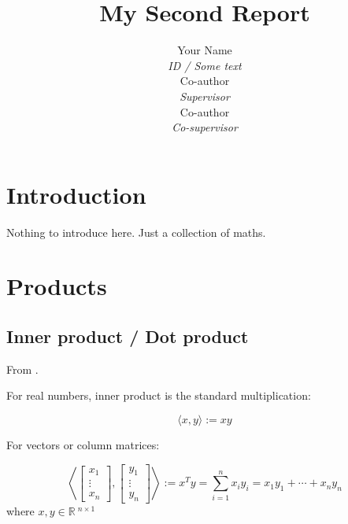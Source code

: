 \documentclass{article}
\title{My Second Report}
\author{Your Name \\ \textit{ID / Some text} \\ \AND
        Co-author \\ \textit{Supervisor} \\ \AND
        Co-author \\ \textit{Co-supervisor}}
\begin{document}
\maketitle




\section{Introduction}
\label{sec: Introduction}

Nothing to introduce here. Just a collection of maths.





\section{Products}
\label{sec: Products}

\subsection{Inner product / Dot product}
\label{subsec: Inner product}

From \cite{wiki2019innerProd,wiki2019dotProd,wiki2019cosineSim}.

For real numbers, inner product is the standard multiplication:

\begin{equation}
    \langle x, y\rangle := x y
\end{equation}

For vectors or column matrices:

\begin{equation}
    \left\langle\left[ \begin{array}{c}{ x_{1}} \\ {\vdots} \\ {x_{n}}\end{array}\right], \left[ \begin{array}{c}{y_{1}} \\ {\vdots} \\ {y_{n}}\end{array}\right]\right\rangle := x^{T} y=\sum_{i=1}^{n} x_{i} y_{i}=x_{1} y_{1}+\cdots+x_{n} y_{n}
\end{equation}
\noindent
where $x, y \in\mathbb{R}\:^{n \times 1}$
\end{document}
